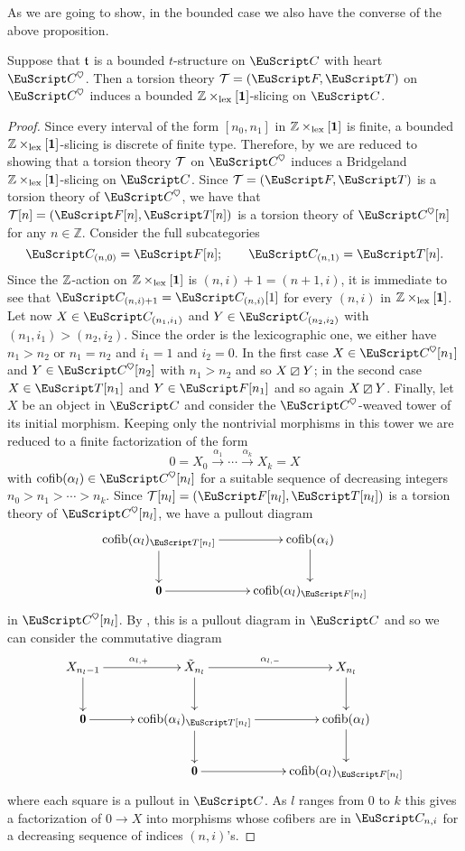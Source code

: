 As we are going to show, in the bounded case we also have the converse of the above proposition.

\begin{lemma}\label{verso.il.tilting}
Suppose that $\mathfrak{t}$ is a bounded $t$-structure on $\C$ with heart $\C^\heart$. Then a torsion theory $\T=(\cate{F},\cate{T})$ on $\C^\heart$ induces a bounded $\mathbb{Z} \times_{\mathrm{lex}} [\mathbf{1}]$-slicing on $\C$. 
\end{lemma} 
\begin{proof}
Since every interval of the form $[n_0,n_1]$ in $\mathbb{Z} \times_{\mathrm{lex}} [\mathbf{1}]$ is finite, a bounded $\mathbb{Z} \times_{\mathrm{lex}} [\mathbf{1}]$-slicing is discrete of finite type. Therefore, by \aprop{} we are reduced to showing that a torsion theory $\mathcal{T}$ on $\C^\heart$ induces a Bridgeland $\mathbb{Z} \times_{\mathrm{lex}} [\mathbf{1}]$-slicing on $\C$. Since $\T=(\cate{F}, \cate{T})$ is a torsion theory of $\C^\heart$, we have that  $\T[n]=(\cate{F}[n], \cate{T}[n])$ is a torsion theory of $\C^\heart[n]$ for any $n\in \mathbb{Z}$.
Consider the full subcategories
\[
\C_{(n,0)}=\cate{F}[n];\qquad 
\C_{(n,1)}=\cate{T}[n].
\]
Since the $\mathbb{Z}$-action on $\mathbb{Z}\times_{\mathrm{lex}}[\mathbf{1}]$ is $(n,i)+1=(n+1,i)$, it is immediate to see that $\C_{(n,i)+1}=\C_{(n,i)}[1]$ for every $(n,i)$ in $\mathbb{Z}\times_{\mathrm{lex}}[\mathbf{1}]$. Let now $X\in \C_{(n_1,i_1)}$ and $Y\in \C_{(n_2,i_2)}$ with $(n_1,i_1)>(n_2,i_2)$. Since the order is the lexicographic one, we either have $n_1>n_2$ or $n_1=n_2$ and $i_1=1$ and $i_2=0$. In the first case $X\in \C^\heart[n_1]$ and $Y\in \C^\heart[n_2]$ with $n_1>n_2$ and so $X\boxslash Y$; in the second case $X\in \cate{T}[n_1]$ and $Y\in \cate{F}[n_1]$ and so again $X\boxslash Y$. Finally, let $X$ be an object in $\C$ and consider the $\C^\heart$-weaved tower of its initial morphism. Keeping only the nontrivial morphisms in this tower we are reduced to a finite factorization of the form
$$0=X_0 \xrightarrow{\alpha_1} \cdots \xrightarrow{\alpha_k} X_k=X$$ 
with $\cofib(\alpha_l)\in \C^\heart[n_l]$ for a suitable sequence of decreasing integers $n_0>n_1>\cdots > n_k$. Since $\T[n_l]=(\cate{F}[n_l], \cate{T}[n_l])$ is a torsion theory of $\C^\heart[n_l]$, we have a pullout diagram
\[
\xymatrix{
\cofib(\alpha_l)_{\cate{T}[n_l]}\ar[d]\ar[r]& \cofib(\alpha_i)\ar[d]\\
\zero\ar[r]& \cofib(\alpha_l)_{\cate{F}[n_l]}
}
\]
in $\C^\heart[n_l]$. By \aprop{}, this is a pullout diagram in $\C$ and so we can consider the commutative diagram
\[
\xymatrix{
X_{n_l-1}\ar[r]^{\alpha_{l,+}}\ar[d] & \tilde{X}_{n_l}\ar[d]\ar[r]^{\alpha_{l,-}}&X_{n_l}\ar[d]\\
 \zero\ar[r]&\cofib(\alpha_i)_{\cate{T}[n_l]}\ar[d]\ar[r]& \cofib(\alpha_l)\ar[d]\\
& \zero\ar[r]& \cofib(\alpha_l)_{\cate{F}[n_l]}
}
\]
where each square is a pullout in $\C$. As $l$ ranges from $0$ to $k$ this gives a factorization of $0\to X$ into morphisms whose cofibers are in $\C_{n,i}$ for a decreasing sequence of indices $(n,i)$'s.
\end{proof}
